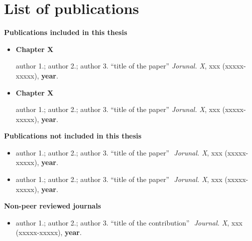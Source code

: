 %
%

\chapter{List of publications}

\textbf{\Large{Publications included in this thesis}}

\begin{itemize}
\renewcommand{\labelitemi}{\scriptsize$\blacksquare$}
 \item \textbf{Chapter X}
 
 author 1.; author 2.; author 3. 
\textquotedblleft title of the paper\textquotedblright \,\,\textit{Jorunal. X}, xxx (xxxxx-xxxxx), \textbf{year}.

 \item \textbf{Chapter X}
 
 author 1.; author 2.; author 3. 
\textquotedblleft title of the paper\textquotedblright \,\,\textit{Jorunal. X}, xxx (xxxxx-xxxxx), \textbf{year}.


\end{itemize}

\noindent\textbf{\Large{Publications not included in this thesis}}


\begin{itemize}
\renewcommand{\labelitemi}{\scriptsize$\blacksquare$}
 \item author 1.; author 2.; author 3.
 \textquotedblleft title of the paper\textquotedblright \,\, \textit{Jorunal. X}, xxx (xxxxx-xxxxx), \textbf{year}.

 \item author 1.; author 2.; author 3.
 \textquotedblleft title of the paper\textquotedblright \,\, \textit{Jorunal. X}, xxx (xxxxx-xxxxx), \textbf{year}.


\end{itemize}

\noindent\textbf{\Large{Non-peer reviewed journals}}

\begin{itemize}
\renewcommand{\labelitemi}{\scriptsize$\blacksquare$}
 \item author 1.; author 2.; author 3. \textquotedblleft title of the contribution\textquotedblright \,\,  
\textit{Journal. X}, xxx (xxxxx-xxxxx),  \textbf{year}.

\end{itemize}













